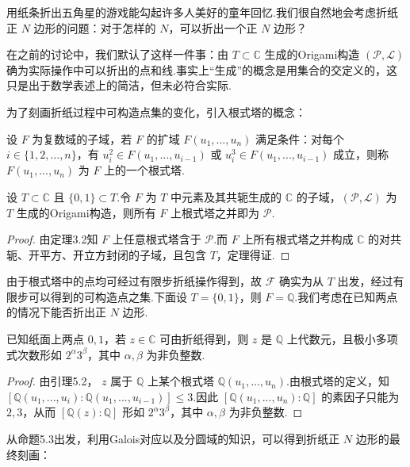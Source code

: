 用纸条折出五角星的游戏能勾起许多人美好的童年回忆.我们很自然地会考虑折纸正 $N$ 边形的问题：对于怎样的 $N$，可以折出一个正 $N$ 边形？

在之前的讨论中，我们默认了这样一件事：由 $T\subset\mathbb{C}$ 生成的Origami构造 $(\mathcal{P},\mathcal{L})$ 确为实际操作中可以折出的点和线.事实上“生成”的概念是用集合的交定义的，这只是出于数学表述上的简洁，但未必符合实际.

为了刻画折纸过程中可构造点集的变化，引入根式塔的概念：

\begin{definition}
    设 $F$ 为复数域的子域，若 $F$ 的扩域 $F(u_1,...,u_n)$ 满足条件：对每个 $i\in\{1,2,...,n\}$，有 $u_i^2\in F(u_1,...,u_{i-1})$ 或 $u_i^3\in F(u_1,...,u_{i-1})$ 成立，则称 $F(u_1,...,u_n)$ 为 $F$ 上的一个根式塔.
\end{definition}

\begin{lemma}
    设 $T\subset\mathbb{C}$ 且 $\{0,1\}\subset T$.令 $F$ 为 $T$ 中元素及其共轭生成的 $\mathbb{C}$ 的子域，$(\mathcal{P},\mathcal{L})$ 为 $T$ 生成的Origami构造，则所有 $F$ 上根式塔之并即为 $\mathcal{P}$.
\end{lemma}

\begin{proof}
    由定理3.2知 $F$ 上任意根式塔含于 $\mathcal{P}$.而 $F$ 上所有根式塔之并构成 $\mathbb{C}$ 的对共轭、开平方、开立方封闭的子域，且包含 $T$，定理得证.
\end{proof}

由于根式塔中的点均可经过有限步折纸操作得到，故 $\mathcal{F}$ 确实为从 $T$ 出发，经过有限步可以得到的可构造点之集.下面设 $T=\{0,1\}$，则 $F=\mathbb{Q}$.我们考虑在已知两点的情况下能否折出正 $N$ 边形.

\begin{proposition}
    已知纸面上两点 $0,1$，若 $z\in\mathbb{C}$ 可由折纸得到，则 $z$ 是 $\mathbb{Q}$ 上代数元，且极小多项式次数形如 $2^\alpha 3^\beta$，其中 $\alpha,\beta$ 为非负整数.
\end{proposition}

\begin{proof}
    由引理5.2， $z$ 属于 $\mathbb{Q}$ 上某个根式塔 $\mathbb{Q}(u_1,...,u_n)$.由根式塔的定义，知 $[\mathbb{Q}(u_1,...,u_i):\mathbb{Q}(u_1,...,u_{i-1})]\leq 3$.因此 $[\mathbb{Q}(u_1,...,u_n):\mathbb{Q}]$ 的素因子只能为 $2,3$，从而 $[\mathbb{Q}(z):\mathbb{Q}]$ 形如 $2^\alpha 3^\beta$，其中 $\alpha,\beta$ 为非负整数.
\end{proof}

从命题5.3出发，利用Galois对应以及分圆域的知识，可以得到折纸正 $N$ 边形的最终刻画：

